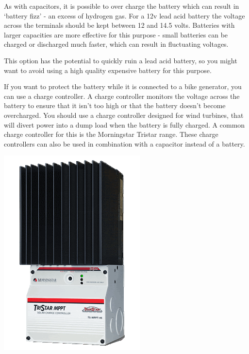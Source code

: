 \documentclass{article}
\theoremstyle{definition}
\theoremstyle{definition}
\theoremstyle{remark}
\begin{document}
      As with capacitors, it is possible to over charge the battery which can result in ‘battery fizz’ - an excess of hydrogen gas. For a 12v lead acid battery the voltage across the terminals should be kept between 12 and 14.5 volts. Batteries with larger capacities are more effective for this purpose - small batteries can be charged or discharged much faster, which can result in fluctuating voltages.

      This option has the potential to quickly ruin a lead acid battery, so you might want to avoid using a high quality expensive battery for this purpose.

      If you want to protect the battery while it is connected to a bike generator, you can use a charge controller. A charge controller monitors the voltage across the battery to ensure that it isn’t too high or that the battery doesn’t become overcharged. You should use a charge controller designed for wind turbines, that will divert power into a dump load when the battery is fully charged. A common charge controller for this is the Morningstar Tristar range. These charge controllers can also be used in combination with a capacitor instead of a battery.

      \begin{center}
        \includegraphics[width=0.10\paperwidth]{../Images/image_3_5_(charge_controller).png}
      \end{center}
    

\end{document}
